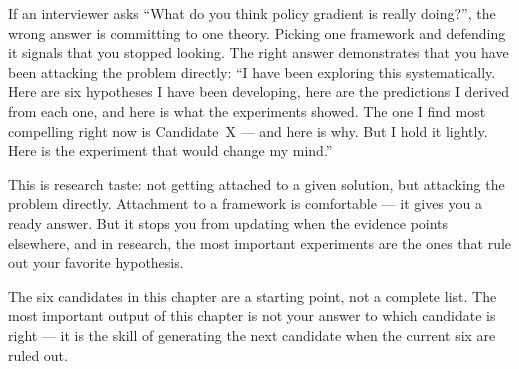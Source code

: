 \begin{taste}
If an interviewer asks ``What do you think policy gradient is really doing?'', the wrong answer is committing to one theory. Picking one framework and defending it signals that you stopped looking. The right answer demonstrates that you have been attacking the problem directly: ``I have been exploring this systematically. Here are six hypotheses I have been developing, here are the predictions I derived from each one, and here is what the experiments showed. The one I find most compelling right now is Candidate~X --- and here is why. But I hold it lightly. Here is the experiment that would change my mind.''

This is research taste: not getting attached to a given solution, but attacking the problem directly. Attachment to a framework is comfortable --- it gives you a ready answer. But it stops you from updating when the evidence points elsewhere, and in research, the most important experiments are the ones that rule out your favorite hypothesis.

The six candidates in this chapter are a starting point, not a complete list. The most important output of this chapter is not your answer to which candidate is right --- it is the skill of generating the next candidate when the current six are ruled out.
\end{taste}

\newpage
